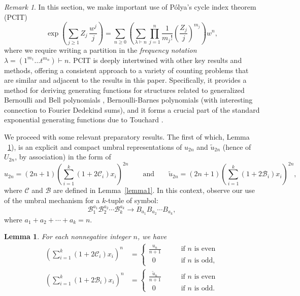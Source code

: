 \documentclass[11pt]{amsart}
\newtheorem{lemma}[theorem]{Lemma}
\theoremstyle{definition}
\theoremstyle{remark}
\newtheorem*{remark}{Remark}
\numberwithin{equation}{section}
\begin{document}
\begin{remark}
In this section, we make important use of P\'olya's cycle index theorem (PCIT) \cite[Section 5]{RPS}
$$\exp\left(\sum_{j\geq1}Z_j\,\frac{w^j}j\right)
=\sum_{n\geq0}\left(\sum_{\lambda\vdash n}  
\prod_{j=1}^n \frac1{m_j!} \left(\frac{Z_j}{j}\right)^{m_j} 
\right)w^n,
$$
where we require writing a partition in the \emph{frequency notation}  $\lambda=(1^{m_1}\dots t^{m_n})\vdash n$. PCIT is deeply intertwined with other key results and methods, offering a consistent approach to a variety of counting problems that are similar and adjacent to the results in this paper. Specifically, it provides a method for deriving generating functions for structures related to generalized Bernoulli and Bell polynomials \cite{Matsusaka}, Bernoulli-Barnes polynomials \cite{BB} (with interesting connection to Fourier Dedekind sums), and it forms a crucial part of the standard exponential generating functions due to Touchard \cite[ Eq'n. (5.30)]{RPS}.
\end{remark}

We proceed with some relevant preparatory results. The first of which, Lemma ~\ref{lm1conj5}), is an explicit and compact umbral representations of $u_{2n}$ and $\widetilde{u}_{2n}$ (hence of $U_{2n}$, by association) in the form of
$$u_{2n} =(2n+1) \left( \sum_{i=1}^k (1+2\mathcal{C}_i)x_i\right)^{2n} \qquad \text{and} \qquad 
\widetilde{u}_{2n} =(2n+1) \left( \sum_{i=1}^k (1+2\mathcal{B}_i)x_i\right)^{2n},$$
where $\mathcal{C}$ and $\mathcal{B}$ are defined in Lemma~\ref{lemma1}.
In this context, observe our use of the umbral mechanism for a $k$-tuple of symbol: 
$$\mathcal{B}_1^{a_1} \mathcal{B}_2^{a_2} \cdots\mathcal{B}_k^{a_k} \longrightarrow
B_{a_1} B_{a_2} \cdots B_{a_k},
$$
where $a_1 + a_2 + \cdots + a_k=n$.

\begin{lemma} \label{lm1conj5} For each nonnegative integer $n$, we have
\begin{align*}
\left(\sum_{i=1}^k (1+2\mathcal{C}_i)x_i\right)^n & = \begin{cases} \frac{u_n}{n+1} \qquad & \text{if $n$ is even} \\  \,\,\, 0 \qquad & \text{if $n$ is odd}, \end{cases}  \\
\left(\sum_{i=1}^k (1+2\mathcal{B}_i)x_i\right)^n & = \begin{cases} \frac{\widetilde{u}_n}{n+1} \qquad & \text{if $n$ is even} \\  \,\,\, 0 \qquad & \text{if $n$ is odd}. \end{cases}
\end{align*}
\end{lemma}
\end{document}

